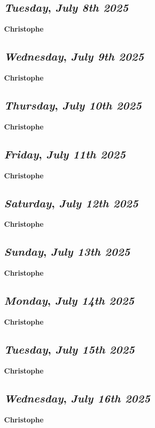 \def\day{\textit{July 8th 2025}}
\def\weekday{\textit{Tuesday}}
\subsection*{\weekday, \day}
\textbf {Christophe}

\def\day{\textit{July 9th 2025}}
\def\weekday{\textit{Wednesday}}
\subsection*{\weekday, \day}
\textbf {Christophe}

\def\day{\textit{July 10th 2025}}
\def\weekday{\textit{Thursday}}
\subsection*{\weekday, \day}
\textbf {Christophe}

\def\day{\textit{July 11th 2025}}
\def\weekday{\textit{Friday}}
\subsection*{\weekday, \day}
\textbf {Christophe}

\def\day{\textit{July 12th 2025}}
\def\weekday{\textit{Saturday}}
\subsection*{\weekday, \day}
\textbf {Christophe}

\def\day{\textit{July 13th 2025}}
\def\weekday{\textit{Sunday}}
\subsection*{\weekday, \day}
\textbf {Christophe}

\def\day{\textit{July 14th 2025}}
\def\weekday{\textit{Monday}}
\subsection*{\weekday, \day}
\textbf {Christophe}

\def\day{\textit{July 15th 2025}}
\def\weekday{\textit{Tuesday}}
\subsection*{\weekday, \day}
\textbf {Christophe}

\def\day{\textit{July 16th 2025}}
\def\weekday{\textit{Wednesday}}
\subsection*{\weekday, \day}
\textbf {Christophe}

